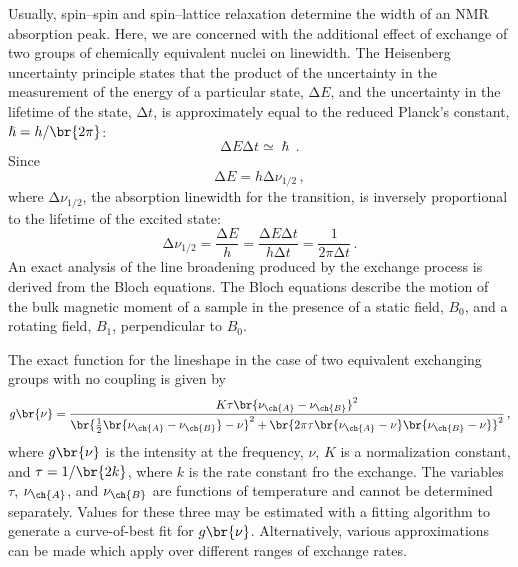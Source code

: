 Usually, spin--spin and spin--lattice relaxation determine the width of an NMR absorption peak.\autocite{levitt08a}
Here, we are concerned with the additional effect of exchange of two groups of chemically equivalent nuclei on linewidth.
The Heisenberg uncertainty principle states that the product of the uncertainty in the measurement of the energy of a particular state, \( \increment E \), and the uncertainty in the lifetime of the state, \( \increment t \), is approximately equal to the reduced Planck's constant, \( \hslash = h/\br{2\pi} \):
\begin{equation}
  \increment E \increment t \simeq \hslash \, .
  \label{eq:heisenberg}
\end{equation}
Since 
\begin{equation}
  \increment E = h \increment \nu_{1/2} \, ,
  \label{eq:width1}
\end{equation}
where \( \increment \nu_{1/2} \), the absorption linewidth for the transition, is inversely proportional to the lifetime of the excited state:
\begin{equation}
  \increment \nu_{1/2} 
    = \frac{\increment E}{h} 
    = \frac{\increment E \increment t}{h \increment t} 
    = \frac{1}{2 \pi \increment t} \, .
  \label{eq:width2}
\end{equation}
An exact analysis of the line broadening produced by the exchange process is derived from the Bloch equations.\autocite{bovey69}
The Bloch equations describe the motion of the bulk magnetic moment of a sample in the presence of a static field, \( B_0 \), and a rotating field, \( B_1 \), perpendicular to \( B_0 \). 

The exact function for the lineshape\autocite{carrington67} in the case of two equivalent exchanging groups with no coupling is given by 
\begin{equation}
  g\br{\nu} = \frac{K \tau \br{\nu_{\ch{A}} - \nu_{\ch{B}}}^2}{
  \br{\frac{1}{2}\br{\nu_{\ch{A}} - \nu_{\ch{B}}} - \nu}^2 + \br{2 \pi \tau \br{\nu_{\ch{A}} - \nu} \br{\nu_{\ch{B}} - \nu}}^2} \, ,
  \label{eq:lineshape}
\end{equation}
where \( g\br{\nu} \) is the intensity at the frequency, \( \nu \), \( K \) is a normalization constant, and \( \tau = 1/\br{2k} \), where \( k \) is the rate constant fro the exchange. 
The variables \( \tau \), \( \nu_{\ch{A}} \), and \( \nu_{\ch{B}} \) are functions of temperature and cannot be determined separately. 
Values for these three may be estimated with a fitting algorithm to generate a curve-of-best fit for \( g\br{\nu} \). 
Alternatively, various approximations can be made which apply over different ranges of exchange rates. 

